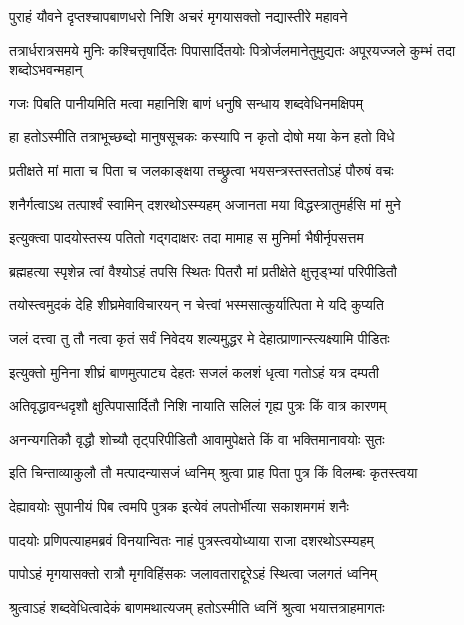 \twolineshloka
{पुराहं यौवने दृप्तश्चापबाणधरो निशि}
{अचरं मृगयासक्तो नद्यास्तीरे महावने} %

\threelineshloka
{तत्रार्धरात्रसमये मुनिः कश्चित्तृषार्दितः}
{पिपासार्दितयोः पित्रोर्जलमानेतुमुद्यतः}
{अपूरयज्जले कुम्भं तदा शब्दोऽभवन्महान्} %

\twolineshloka
{गजः पिबति पानीयमिति मत्वा महानिशि}
{बाणं धनुषि सन्धाय शब्दवेधिनमक्षिपम्} %

\twolineshloka
{हा हतोऽस्मीति तत्राभूच्छब्दो मानुषसूचकः}
{कस्यापि न कृतो दोषो मया केन हतो विधे} %

\twolineshloka
{प्रतीक्षते मां माता च पिता च जलकाङ्क्षया}
{तच्छ्रुत्वा भयसन्त्रस्तस्ततोऽहं पौरुषं वचः} %

\twolineshloka
{शनैर्गत्वाऽथ तत्पार्श्वं स्वामिन् दशरथोऽस्म्यहम्}
{अजानता मया विद्धस्त्रातुमर्हसि मां मुने} %

\twolineshloka
{इत्युक्त्वा पादयोस्तस्य पतितो गद्गदाक्षरः}
{तदा मामाह स मुनिर्मा भैषीर्नृपसत्तम} %

\twolineshloka
{ब्रह्महत्या स्पृशेन्न त्वां वैश्योऽहं तपसि स्थितः}
{पितरौ मां प्रतीक्षेते क्षुत्तृड्भ्यां परिपीडितौ} %

\twolineshloka
{तयोस्त्वमुदकं देहि शीघ्रमेवाविचारयन्}
{न चेत्त्वां भस्मसात्कुर्यात्पिता मे यदि कुप्यति} %

\twolineshloka
{जलं दत्त्वा तु तौ नत्वा कृतं सर्वं निवेदय}
{शल्यमुद्धर मे देहात्प्राणान्स्त्यक्ष्यामि पीडितः} %

\twolineshloka
{इत्युक्तो मुनिना शीघ्रं बाणमुत्पाट्य देहतः}
{सजलं कलशं धृत्वा गतोऽहं यत्र दम्पती} %

\twolineshloka
{अतिवृद्धावन्धदृशौ क्षुत्पिपासार्दितौ निशि}
{नायाति सलिलं गृह्य पुत्रः किं वात्र कारणम्} %

\twolineshloka
{अनन्यगतिकौ वृद्धौ शोच्यौ तृट्परिपीडितौ}
{आवामुपेक्षते किं वा भक्तिमानावयोः सुतः} %

\twolineshloka
{इति चिन्ताव्याकुलौ तौ मत्पादन्यासजं ध्वनिम्}
{श्रुत्वा प्राह पिता पुत्र किं विलम्बः कृतस्त्वया} %

\twolineshloka
{देह्यावयोः सुपानीयं पिब त्वमपि पुत्रक}
{इत्येवं लपतोर्भीत्या सकाशमगमं शनैः} %

\twolineshloka
{पादयोः प्रणिपत्याहमब्रवं विनयान्वितः}
{नाहं पुत्रस्त्वयोध्याया राजा दशरथोऽस्म्यहम्} %

\twolineshloka
{पापोऽहं मृगयासक्तो रात्रौ मृगविहिंसकः}
{जलावताराद्दूरेऽहं स्थित्वा जलगतं ध्वनिम्} %

\twolineshloka
{श्रुत्वाऽहं शब्दवेधित्वादेकं बाणमथात्यजम्}
{हतोऽस्मीति ध्वनिं श्रुत्वा भयात्तत्राहमागतः} %

